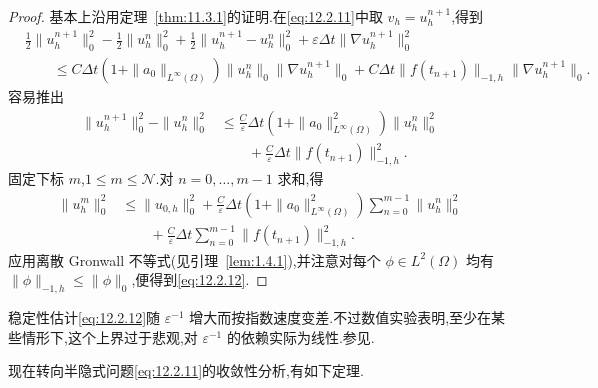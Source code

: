 \begin{proof}
基本上沿用定理~\ref{thm:11.3.1}的证明.在\eqref{eq:12.2.11}中取 \(v_h=u_h^{n+1}\),得到
\[
  \begin{aligned}
    &\tfrac12\|u_h^{n+1}\|_0^2-\tfrac12\|u_h^n\|_0^2
      +\tfrac12\|u_h^{n+1}-u_h^n\|_0^2
      +\varepsilon\Delta t\|\nabla u_h^{n+1}\|_0^2\\
    &\qquad\le C\Delta t(1+\|a_0\|_{L^\infty(\Omega)})
           \|u_h^n\|_0\|\nabla u_h^{n+1}\|_0
         +C\Delta t\|f(t_{n+1})\|_{-1,h}\|\nabla u_h^{n+1}\|_0.
  \end{aligned}
\]
容易推出
\[
  \begin{aligned}
    \|u_h^{n+1}\|_0^2-\|u_h^n\|_0^2
      &\le\frac{C}{\varepsilon}\Delta t
        (1+\|a_0\|_{L^\infty(\Omega)}^2)\|u_h^n\|_0^2\\
      &\qquad+\frac{C}{\varepsilon}\Delta t\|f(t_{n+1})\|_{-1,h}^2.
  \end{aligned}
\]
固定下标 \(m\),\(1\le m\le\mathcal N\).对 \(n=0,\ldots,m-1\) 求和,得
\[
  \begin{aligned}
    \|u_h^m\|_0^2
      &\le\|u_{0,h}\|_0^2+\frac{C}{\varepsilon}\Delta t
        (1+\|a_0\|_{L^\infty(\Omega)}^2)\sum_{n=0}^{m-1}\|u_h^n\|_0^2\\
      &\qquad+\frac{C}{\varepsilon}\Delta t\sum_{n=0}^{m-1}
          \|f(t_{n+1})\|_{-1,h}^2.
  \end{aligned}
\]
应用离散 Gronwall 不等式(见引理~\ref{lem:1.4.1}),并注意对每个 \(\phi\in L^2(\Omega)\) 均有 \(\|\phi\|_{-1,h}\le\|\phi\|_0\),便得到\eqref{eq:12.2.12}.
\end{proof}

稳定性估计\eqref{eq:12.2.12}随 \(\varepsilon^{-1}\) 增大而按指数速度变差.不过数值实验表明,至少在某些情形下,这个上界过于悲观,对 \(\varepsilon^{-1}\) 的依赖实际为线性.参见.

现在转向半隐式问题\eqref{eq:12.2.11}的收敛性分析,有如下定理.

